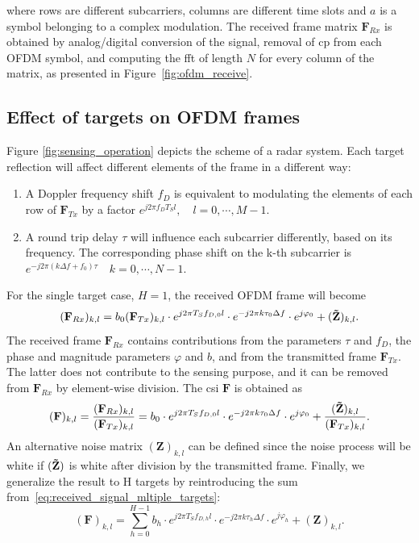     where rows are different subcarriers, columns are different time slots and $a$ is a symbol belonging to a complex modulation.
    The received frame matrix $\mathbf F_{Rx}$ is obtained by analog/digital conversion of the signal, removal of \gls{cp} from each OFDM symbol, and computing the \gls{fft} of length $N$ for every column of the matrix, as presented in Figure~\ref{fig:ofdm_receive}.
    
    \subsection{Effect of targets on OFDM frames}
    Figure \ref{fig:sensing_operation} depicts the scheme of a radar system.
    Each target reflection will affect different elements of the frame in a different way:
    \begin{enumerate}
        \item A Doppler frequency shift $f_D$ is equivalent to modulating the elements of each row of $\mathbf F_{Tx}$ by a factor $e^{j2\pi f_D T_S l},\quad  l = 0, \cdots, M-1$.
        \item A round trip delay $\tau$ will influence each subcarrier differently, based on its frequency. The corresponding phase shift on the k-th subcarrier is \\$e^{-j2\pi (k\Delta f + f_0)\tau} \quad  k = 0, \cdots, N-1$.
    \end{enumerate}
    For the single target case, $H=1$, the received OFDM frame will become
    \begin{equation}
        (\mathbf F_{Rx})_{k,l} = b_0(\mathbf F_{Tx})_{k,l} \cdot e^{j2\pi T_S f_{D,0} l}\cdot e^{-j2\pi k \tau_0 \Delta f} \cdot e^{j\varphi_0} + (\mathbf{\Tilde{Z}})_{k,l}.
    \end{equation}
    The received frame $\mathbf{F}_{Rx}$ contains contributions from the parameters $\tau$ and $f_D$, the phase and magnitude parameters $\varphi$ and $b$, and from the transmitted frame $\mathbf F_{Tx}$.
    The latter does not contribute to the sensing purpose, and it can be removed from $\mathbf F_{Rx}$ by element-wise division.
    The \gls{csi} $\mathbf F$ is obtained as
    \begin{equation}
        (\mathbf F)_{k,l} = \frac{(\mathbf F_{Rx})_{k,l}}{(\mathbf F_{Tx})_{k,l}} = b_0 \cdot e^{j2\pi T_S f_{D,0} l}\cdot e^{-j2\pi k \tau_0 \Delta f} \cdot e^{j\varphi_0} + \frac{(\mathbf{\Tilde{Z}})_{k,l}}{(\mathbf F_{Tx})_{k,l}}\label{eq:CSI_frame}.    
    \end{equation}
    An alternative noise matrix $(\mathbf{Z})_{k,l}$ can be defined since the noise process will be white if $(\mathbf{\Tilde{Z}})$ is white after division by the transmitted frame.
    Finally, we generalize the result to H targets by reintroducing the sum from~\eqref{eq:received_signal_mltiple_targets}:
    \begin{equation}
        (\mathbf F)_{k,l} =  \sum_{h=0}^{H-1} b_h \cdot e^{j2\pi T_S f_{D,h} l}\cdot e^{-j2\pi k \tau_h \Delta f} \cdot e^{j\varphi_h} + (\mathbf{Z})_{k,l}.
    \end{equation}
    
